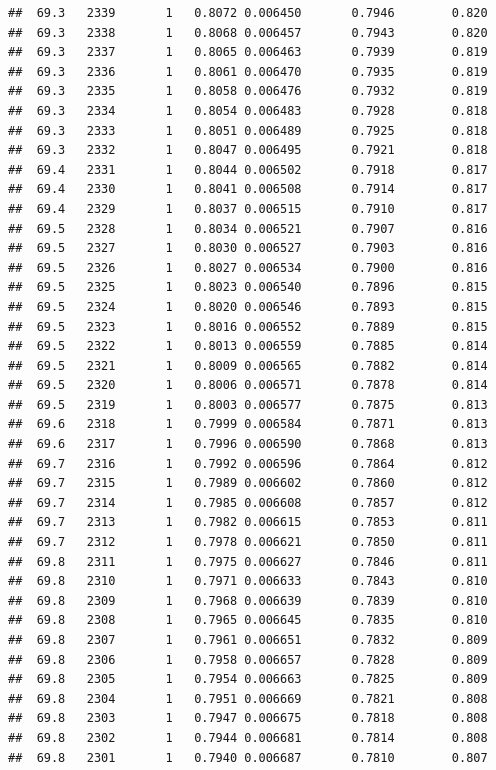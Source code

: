 \documentclass[
]{book}
\begin{document}
\begin{verbatim}
##  69.3   2339       1   0.8072 0.006450       0.7946        0.820
##  69.3   2338       1   0.8068 0.006457       0.7943        0.820
##  69.3   2337       1   0.8065 0.006463       0.7939        0.819
##  69.3   2336       1   0.8061 0.006470       0.7935        0.819
##  69.3   2335       1   0.8058 0.006476       0.7932        0.819
##  69.3   2334       1   0.8054 0.006483       0.7928        0.818
##  69.3   2333       1   0.8051 0.006489       0.7925        0.818
##  69.3   2332       1   0.8047 0.006495       0.7921        0.818
##  69.4   2331       1   0.8044 0.006502       0.7918        0.817
##  69.4   2330       1   0.8041 0.006508       0.7914        0.817
##  69.4   2329       1   0.8037 0.006515       0.7910        0.817
##  69.5   2328       1   0.8034 0.006521       0.7907        0.816
##  69.5   2327       1   0.8030 0.006527       0.7903        0.816
##  69.5   2326       1   0.8027 0.006534       0.7900        0.816
##  69.5   2325       1   0.8023 0.006540       0.7896        0.815
##  69.5   2324       1   0.8020 0.006546       0.7893        0.815
##  69.5   2323       1   0.8016 0.006552       0.7889        0.815
##  69.5   2322       1   0.8013 0.006559       0.7885        0.814
##  69.5   2321       1   0.8009 0.006565       0.7882        0.814
##  69.5   2320       1   0.8006 0.006571       0.7878        0.814
##  69.5   2319       1   0.8003 0.006577       0.7875        0.813
##  69.6   2318       1   0.7999 0.006584       0.7871        0.813
##  69.6   2317       1   0.7996 0.006590       0.7868        0.813
##  69.7   2316       1   0.7992 0.006596       0.7864        0.812
##  69.7   2315       1   0.7989 0.006602       0.7860        0.812
##  69.7   2314       1   0.7985 0.006608       0.7857        0.812
##  69.7   2313       1   0.7982 0.006615       0.7853        0.811
##  69.7   2312       1   0.7978 0.006621       0.7850        0.811
##  69.8   2311       1   0.7975 0.006627       0.7846        0.811
##  69.8   2310       1   0.7971 0.006633       0.7843        0.810
##  69.8   2309       1   0.7968 0.006639       0.7839        0.810
##  69.8   2308       1   0.7965 0.006645       0.7835        0.810
##  69.8   2307       1   0.7961 0.006651       0.7832        0.809
##  69.8   2306       1   0.7958 0.006657       0.7828        0.809
##  69.8   2305       1   0.7954 0.006663       0.7825        0.809
##  69.8   2304       1   0.7951 0.006669       0.7821        0.808
##  69.8   2303       1   0.7947 0.006675       0.7818        0.808
##  69.8   2302       1   0.7944 0.006681       0.7814        0.808
##  69.8   2301       1   0.7940 0.006687       0.7810        0.807

\end{verbatim}
\end{document}
